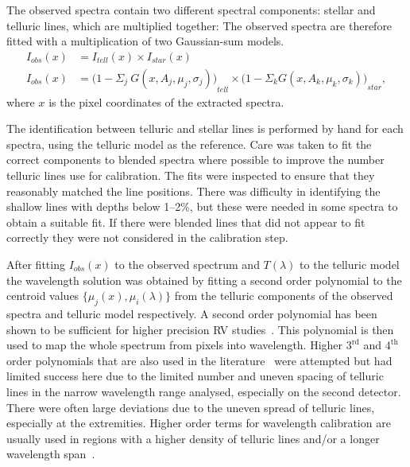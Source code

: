 The observed spectra contain two different spectral components: stellar and telluric lines, which are multiplied together: The observed spectra are therefore fitted with a multiplication of two Gaussian-sum models.
\begin{align}
I_{obs}(x) &= {I}_{tell}(x) \times {I}_{star}(x) \nonumber \\
I_{obs}(x) &= {\Big(1 - {\Sigma}_{j}\ G(x, A_{j}, {\mu}_{j}, {\sigma}_{j})\Big)}_{tell} \times {\Big(1 - {\Sigma}_{k} G(x, A_{k}, {\mu}_{k}, {\sigma}_{k})\Big)}_{star}, \label{eqn:obs}
\end{align}
where \(x\) is the pixel coordinates of the extracted spectra.

The identification between telluric and stellar lines is performed by hand for each spectra, using the telluric model as the reference.
Care was taken to fit the correct components to blended spectra where possible to improve the number telluric lines use for calibration.
The fits were inspected to ensure that they reasonably matched the line positions.
There was difficulty in identifying the shallow lines with depths below 1--2\%, but these were needed in some spectra to obtain a suitable fit.
If there were blended lines that did not appear to fit correctly they were not considered in the calibration step.

After fitting \(I_{obs}(x)\) to the observed spectrum and \(T(\lambda)\) to the telluric model the wavelength solution was obtained by fitting a second order polynomial to the centroid values \(\{\mu_{j}(x), \mu_{i}(\lambda)\}\) from the telluric components of the observed spectra and telluric model respectively.
A second order polynomial has been shown to be sufficient for higher precision {RV} studies~\citep[e.g.][]{bean_groundbased_2010, figueira_radial_2010}.
This polynomial is then used to map the whole spectrum from pixels into wavelength.
Higher \(3^{\textrm{rd}}\) and \(4^{\textrm{th}}\) order polynomials that are also used in the literature~\citet[e.g.][]{seifahrt_synthesising_2010, ulmer-moll_telluric_2018} were attempted but had limited success here due to the limited number and uneven spacing of telluric lines in the narrow wavelength range analysed, especially on the second detector.
There were often large deviations due to the uneven spread of telluric lines, especially at the extremities.
Higher order terms for wavelength calibration are usually used in regions with a higher density of telluric lines and/or a longer wavelength span~\citep{piskorz_evidence_2016, seifahrt_synthesising_2010, ulmer-moll_telluric_2018}.

